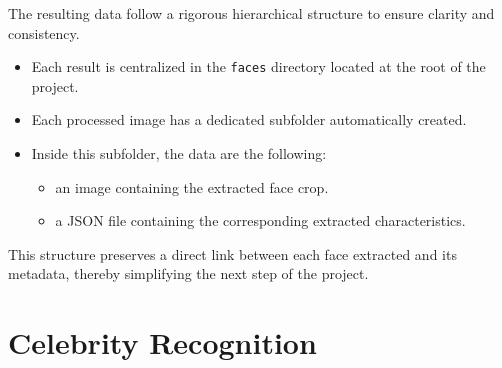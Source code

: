 \documentclass[a4paper,12pt]{article}
\begin{document}
The resulting data follow a rigorous hierarchical structure to ensure clarity and consistency.
\begin{itemize}
    \item Each result is centralized in the \texttt{faces} directory located at the root of the project.
    \item Each processed image has a dedicated subfolder automatically created.
    \item Inside this subfolder, the data are the following:
    \begin{itemize}
        \item an image containing the extracted face crop.
        \item a JSON file containing the corresponding extracted characteristics.
    \end{itemize}
\end{itemize}
This structure preserves a direct link between each face extracted and its metadata, thereby simplifying the next step of the project.

\newpage

\section{Celebrity Recognition}
\end{document}
